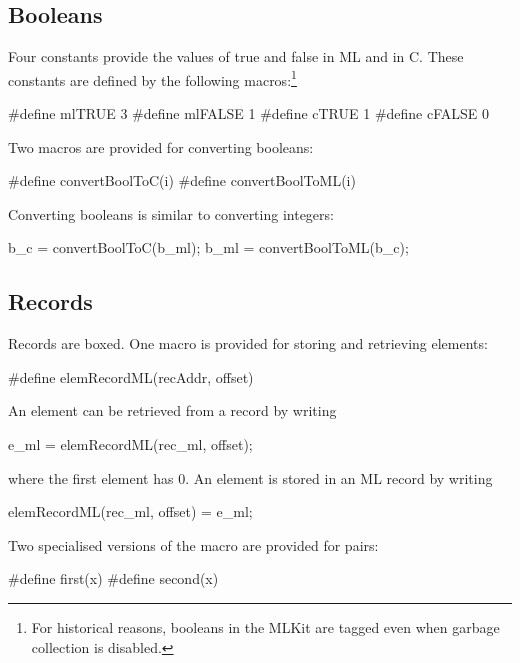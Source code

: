 \documentclass[12pt]{book}
\begin{document}
\subsection{Booleans}
Four constants provide the values of true and false in ML and in C.  These
constants are defined by the following macros:\footnote{For historical reasons,
booleans in the MLKit are tagged even when garbage collection is disabled.}
%
%
%
%
%
%
\begin{scriptcode}
  #define mlTRUE  3
  #define mlFALSE 1
  #define cTRUE   1
  #define cFALSE  0
\end{scriptcode}

Two macros are provided for converting booleans:
%
%
%
%
\begin{scriptcode}
  #define convertBoolToC(i)
  #define convertBoolToML(i)
\end{scriptcode}
Converting booleans is similar to converting integers:
\begin{scriptcode}
  b_c = convertBoolToC(b_ml);
  b_ml = convertBoolToML(b_c);
\end{scriptcode}

\subsection{Records}
Records are boxed. One macro is provided for storing and retrieving elements:
%
%
%
\begin{scriptcode}
  #define elemRecordML(recAddr, offset)
\end{scriptcode}
An element can be retrieved from a record  by writing
\begin{scriptcode}
  e_ml = elemRecordML(rec_ml, offset);
\end{scriptcode}
where the first element has  0. An element  is stored in an
ML record  by writing
\begin{scriptcode}
  elemRecordML(rec_ml, offset) = e_ml;
\end{scriptcode}
Two specialised versions of the  macro are provided for
%
%
%
%
pairs:
\begin{scriptcode}
  #define first(x)
  #define second(x)
\end{scriptcode}
\end{document}
